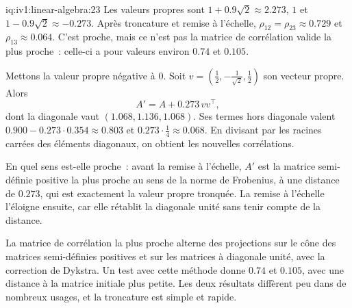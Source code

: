 \begin{solution}{iq:iv1:linear-algebra:23}
Les valeurs propres sont $1 + 0.9\sqrt{2} \approx 2.273$, $1$ et $1 - 0.9\sqrt{2} \approx -0.273$. Après troncature et remise à l'échelle, $\rho_{12} = \rho_{23} \approx 0.729$ et $\rho_{13} \approx 0.064$. C'est proche, mais ce n'est pas la matrice de corrélation valide la plus proche~: celle-ci a pour valeurs environ $0.74$ et $0.105$.

Mettons la valeur propre négative à 0. Soit $v = (\tfrac12, -\tfrac{1}{\sqrt{2}}, \tfrac12)$ son vecteur propre. Alors
\[
A' = A + 0.273\,vv^\top,
\]
dont la diagonale vaut $(1.068, 1.136, 1.068)$. Ses termes hors diagonale valent $0.900 - 0.273 \cdot 0.354 \approx 0.803$ et $0.273 \cdot \tfrac14 \approx 0.068$. En divisant par les racines carrées des éléments diagonaux, on obtient les nouvelles corrélations.

En quel sens est-elle proche~: avant la remise à l'échelle, $A'$ est la matrice semi-définie positive la plus proche au sens de la norme de Frobenius, à une distance de $0.273$, qui est exactement la valeur propre tronquée. La remise à l'échelle l'éloigne ensuite, car elle rétablit la diagonale unité sans tenir compte de la distance.

La matrice de corrélation la plus proche alterne des projections sur le cône des matrices semi-définies positives et sur les matrices à diagonale unité, avec la correction de Dykstra. Un test avec cette méthode donne $0.74$ et $0.105$, avec une distance à la matrice initiale plus petite. Les deux résultats diffèrent peu dans de nombreux usages, et la troncature est simple et rapide.

\end{solution}

